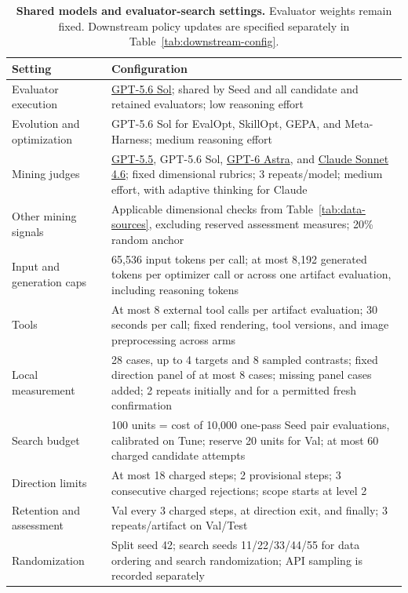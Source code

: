 \begin{table}[!htbp]
\caption{\textbf{Shared models and evaluator-search settings.} Evaluator weights remain fixed. Downstream policy updates are specified separately in Table~\ref{tab:downstream-config}.}
\label{tab:run-config}
\centering\small
\begin{tabularx}{\linewidth}{@{}P{3.0cm}Y@{}}
\toprule
Setting & Configuration\\
\midrule
Evaluator execution & \href{https://developers.openai.com/api/docs/models/gpt-5.6-sol}{GPT-5.6 Sol}; shared by Seed and all candidate and retained evaluators; low reasoning effort\\
Evolution and optimization & GPT-5.6 Sol for EvalOpt, SkillOpt, GEPA, and Meta-Harness; medium reasoning effort\\
Mining judges & \href{https://developers.openai.com/api/docs/models/gpt-5.5}{GPT-5.5}, GPT-5.6 Sol, \href{https://developers.openai.com/api/docs/models/gpt-6-astra}{GPT-6 Astra}, and \href{https://platform.claude.com/docs/en/models/sonnet-4-6/overview}{Claude Sonnet 4.6}; fixed dimensional rubrics; 3 repeats/model; medium effort, with adaptive thinking for Claude\\
Other mining signals & Applicable dimensional checks from Table~\ref{tab:data-sources}, excluding reserved assessment measures; 20\% random anchor\\
Input and generation caps & 65,536 input tokens per call; at most 8,192 generated tokens per optimizer call or across one artifact evaluation, including reasoning tokens\\
Tools & At most 8 external tool calls per artifact evaluation; 30 seconds per call; fixed rendering, tool versions, and image preprocessing across arms\\
Local measurement & 28 cases, up to 4 targets and 8 sampled contrasts; fixed direction panel of at most 8 cases; missing panel cases added; 2 repeats initially and for a permitted fresh confirmation\\
Search budget & 100 units = cost of 10,000 one-pass Seed pair evaluations, calibrated on Tune; reserve 20 units for Val; at most 60 charged candidate attempts\\
Direction limits & At most 18 charged steps; 2 provisional steps; 3 consecutive charged rejections; scope starts at level 2\\
Retention and assessment & Val every 3 charged steps, at direction exit, and finally; 3 repeats/artifact on Val/Test\\
Randomization & Split seed 42; search seeds 11/22/33/44/55 for data ordering and search randomization; API sampling is recorded separately\\
\bottomrule
\end{tabularx}
\end{table}

